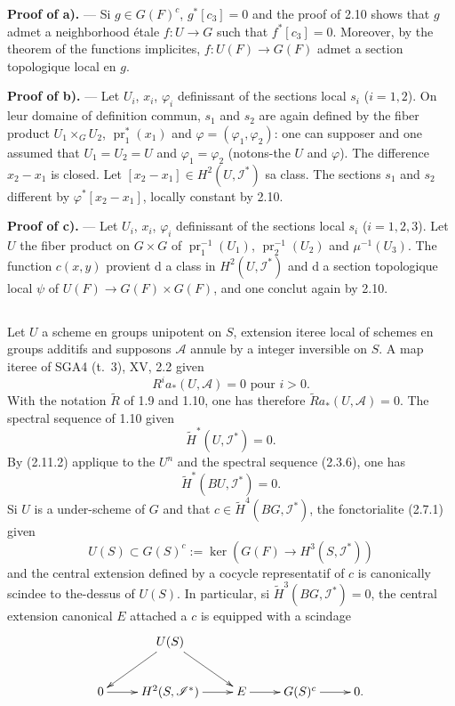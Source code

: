 \documentclass[11pt,a4paper]{article}
\theoremstyle{plain}
\theoremstyle{definition}
\DeclareMathOperator{\pr}{pr}
\begin{document}
\textbf{Proof of a).} --- Si $g \in G(F)^c$, $g^*[c_3] = 0$ and the proof of 2.10 shows that $g$ admet a neighborhood étale $f : U \to G$ such that $f^*[c_3] = 0$. Moreover, by the theorem of the functions implicites, $f : U(F) \to G(F)$ admet a section topologique local en $g$.

\textbf{Proof of b).} --- Let $U_i$, $x_i$, $\varphi_i$ definissant of the sections local $s_i$ ($i = 1, 2$). On leur domaine of definition commun, $s_1$ and $s_2$ are again defined by the fiber product $U_1 \times_G U_2$, $\pr_1^*(x_1)$ and $\varphi = (\varphi_1, \varphi_2)$: one can supposer and one assumed that $U_1 = U_2 = U$ and $\varphi_1 = \varphi_2$ (notons-the $U$ and $\varphi$). The difference $x_2 - x_1$ is closed. Let $[x_2 - x_1] \in H^2(U, \mathscr{I}^*)$ sa class. The sections $s_1$ and $s_2$ different by $\varphi^*[x_2 - x_1]$, locally constant by 2.10.

\textbf{Proof of c).} --- Let $U_i$, $x_i$, $\varphi_i$ definissant of the sections local $s_i$ ($i = 1, 2, 3$). Let $U$ the fiber product on $G \times G$ of $\pr_1^{-1}(U_1)$, $\pr_2^{-1}(U_2)$ and $\mu^{-1}(U_3)$. The function $c(x,y)$ provient d a class in $H^2(U, \mathscr{I}^*)$ and d a section topologique local $\psi$ of $U(F) \to G(F) \times G(F)$, and one conclut again by 2.10.

\subsection{}\label{2.11}

Let $U$ a scheme en groups unipotent on $S$, extension iteree local of schemes en groups additifs and supposons $\mathscr{A}$ annule by a integer inversible on $S$. A map iteree of SGA4 (t.~3), XV, 2.2 given
\begin{equation}\label{2.11.1}
R^i a_* (U, \mathscr{A}) = 0 \text{ pour } i > 0.
\end{equation}
With the notation $\widetilde{R}$ of 1.9 and 1.10, one has therefore $\widetilde{R} a_* (U, \mathscr{A}) = 0$. The spectral sequence of 1.10 given
\begin{equation}\label{2.11.2}
\widetilde{H}^*(U, \mathscr{I}^*) = 0.
\end{equation}
By (2.11.2) applique to the $U^n$ and the spectral sequence (2.3.6), one has
\begin{equation}\label{2.11.3}
\widetilde{H}^*(BU, \mathscr{I}^*) = 0.
\end{equation}
Si $U$ is a under-scheme of $G$ and that $c \in \widetilde{H}^4(BG, \mathscr{I}^*)$, the fonctorialite (2.7.1) given
\begin{equation}\label{2.11.4}
U(S) \subset G(S)^c := \ker(G(F) \to H^3(S, \mathscr{I}^*))
\end{equation}
and the central extension defined by a cocycle representatif of $c$ is canonically scindee to the-dessus of $U(S)$. In particular, si $\widetilde{H}^3(BG, \mathscr{I}^*) = 0$, the central extension canonical $E$ attached a $c$ is equipped with a scindage
\[
\xymatrix{
& U(S) \ar[dl] \ar[dr] & \\
0 \ar[r] & H^2(S, \mathscr{I}^*) \ar[r] & E \ar[r] & G(S)^c \ar[r] & 0.
}
\]
\end{document}
